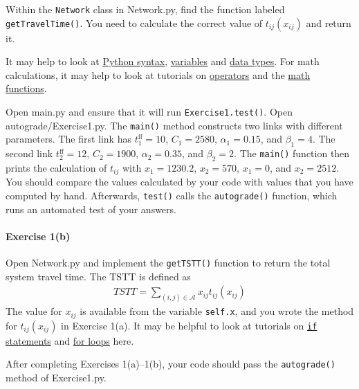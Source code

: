 \documentclass[11pt]{article}
\newcommand{\A}{\mathcal{A}}
\begin{document}
Within the \texttt{Network} class in Network.py, find the function labeled \texttt{getTravelTime()}. You need to calculate the correct value of $t_{ij}(x_{ij})$ and return it.


It may help to look at  \href{https://www.w3schools.com/python/python_syntax.asp}{Python syntax},  \href{https://www.w3schools.com/python/python_variables.asp}{variables} and \href{https://www.w3schools.com/python/python_datatypes.asp}{data types}. For math calculations, it may help to look at tutorials on \href{https://www.w3schools.com/python/python_operators.asp}{operators} and the \href{https://www.w3schools.com/python/python_math.asp}{math functions}. 


\noindent Open main.py and ensure that it will run \texttt{Exercise1.test()}.
Open autograde/Exercise1.py. The \texttt{main()} method constructs two links with different parameters. The first link has $t^{\mathrm{ff}}_{1}=10$, $C_{1}=2580$, $\alpha_{1}=0.15$, and $\beta_{1}=4$. The second link $t^{\mathrm{ff}}_{2}=12$, $C_{2}=1900$, $\alpha_{2}=0.35$, and $\beta_{2}=2$. The \texttt{main()} function then prints the calculation of $t_{ij}$ with $x_{1}=1230.2$, $x_2=570$, $x_1=0$, and $x_2=2512$. You should compare the values calculated by your code with values that you have computed by hand. 
Afterwards, \texttt{test()} calls the \texttt{autograde()} function, which runs an automated test of your answers. 


	
\paragraph*{Exercise 1(b)}  Open Network.py and implement the \texttt{getTSTT()} function to  return the total system travel time. The TSTT is defined as
\begin{align}
	TSTT = \sum_{(i,j)\in\A} x_{ij} t_{ij}(x_{ij})
\end{align}
The value for $x_{ij}$ is available from the variable \texttt{self.x}, and you wrote the method for $t_{ij}(x_{ij})$ in Exercise 1(a).
%
It may be helpful to look at tutorials on \href{https://www.w3schools.com/python/python_conditions.asp}{\texttt{if} statements}
 and \href{https://www.w3schools.com/python/python_for_loops.asp}{for loops} here.  


\vspace\baselineskip

\noindent
After completing Exercises 1(a)--1(b), your code should pass the \texttt{autograde()} method of Exercise1.py. 
\end{document}
